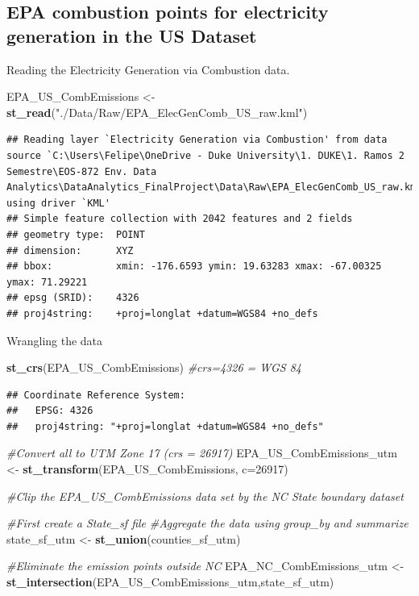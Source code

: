 \documentclass[12pt,]{article}
\newenvironment{Shaded}{\begin{snugshade}}{\end{snugshade}}
\newcommand{\KeywordTok}[1]{\textcolor[rgb]{0.13,0.29,0.53}{\textbf{#1}}}
\newcommand{\DataTypeTok}[1]{\textcolor[rgb]{0.13,0.29,0.53}{#1}}
\newcommand{\DecValTok}[1]{\textcolor[rgb]{0.00,0.00,0.81}{#1}}
\newcommand{\StringTok}[1]{\textcolor[rgb]{0.31,0.60,0.02}{#1}}
\newcommand{\CommentTok}[1]{\textcolor[rgb]{0.56,0.35,0.01}{\textit{#1}}}
\newcommand{\NormalTok}[1]{#1}
\begin{document}
\subsection{EPA combustion points for electricity generation in the US
Dataset}\label{epa-combustion-points-for-electricity-generation-in-the-us-dataset-1}

Reading the Electricity Generation via Combustion data.

\begin{Shaded}
\begin{Highlighting}[]
\NormalTok{EPA_US_CombEmissions <-}\StringTok{ }\KeywordTok{st_read}\NormalTok{(}\StringTok{"./Data/Raw/EPA_ElecGenComb_US_raw.kml"}\NormalTok{)}
\end{Highlighting}
\end{Shaded}

\begin{verbatim}
## Reading layer `Electricity Generation via Combustion' from data source `C:\Users\Felipe\OneDrive - Duke University\1. DUKE\1. Ramos 2 Semestre\EOS-872 Env. Data Analytics\DataAnalytics_FinalProject\Data\Raw\EPA_ElecGenComb_US_raw.kml' using driver `KML'
## Simple feature collection with 2042 features and 2 fields
## geometry type:  POINT
## dimension:      XYZ
## bbox:           xmin: -176.6593 ymin: 19.63283 xmax: -67.00325 ymax: 71.29221
## epsg (SRID):    4326
## proj4string:    +proj=longlat +datum=WGS84 +no_defs
\end{verbatim}

Wrangling the data

\begin{Shaded}
\begin{Highlighting}[]
\KeywordTok{st_crs}\NormalTok{(EPA_US_CombEmissions) }\CommentTok{#crs=4326 = WGS 84}
\end{Highlighting}
\end{Shaded}

\begin{verbatim}
## Coordinate Reference System:
##   EPSG: 4326 
##   proj4string: "+proj=longlat +datum=WGS84 +no_defs"
\end{verbatim}

\begin{Shaded}
\begin{Highlighting}[]
\CommentTok{#Convert all to UTM Zone 17 (crs = 26917)}
\NormalTok{EPA_US_CombEmissions_utm <-}\StringTok{ }\KeywordTok{st_transform}\NormalTok{(EPA_US_CombEmissions, }\DataTypeTok{c=}\DecValTok{26917}\NormalTok{)}

\CommentTok{#Clip the EPA_US_CombEmissions data set by the NC State boundary dataset}

\CommentTok{#First create a State_sf file}
\CommentTok{#Aggregate the data using group_by and summarize}
\NormalTok{state_sf_utm <-}\StringTok{ }\KeywordTok{st_union}\NormalTok{(counties_sf_utm)}

\CommentTok{#Eliminate the emission points outside NC}
\NormalTok{EPA_NC_CombEmissions_utm <-}\StringTok{ }\KeywordTok{st_intersection}\NormalTok{(EPA_US_CombEmissions_utm,state_sf_utm) }
\end{Highlighting}
\end{Shaded}
\end{document}
